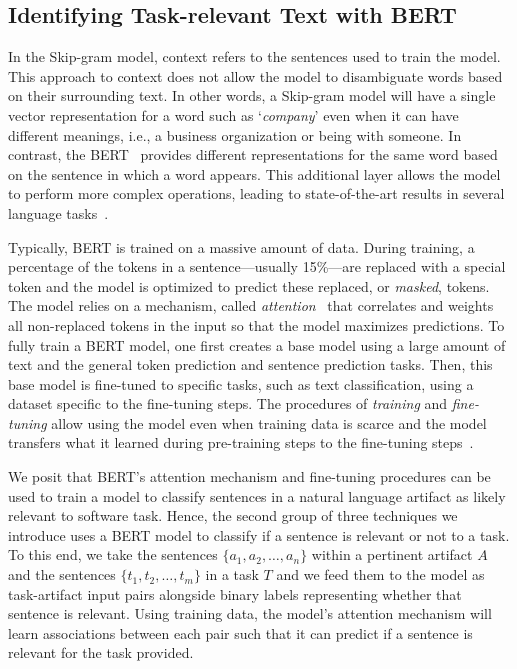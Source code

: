     

\subsection{Identifying Task-relevant Text with BERT}
\label{cp5:approach-bert}


In the Skip-gram model, context refers to the sentences used to train the model. This approach to context  does not allow the model to disambiguate words based on their surrounding text. In other words, a Skip-gram model will have a single vector representation for a word such as `\textit{company}' even when it can have different meanings, i.e., a business organization or being with someone. In contrast, 
the \acf{BERT}~\cite{Devlin2018Bert} provides different representations for the same word based on the sentence in which a word appears.
This additional layer allows the model to perform more complex operations,
leading to state-of-the-art results in several language tasks~\cite{Devlin2018Bert}. 





Typically, BERT is trained 
on a massive amount of data. During training, a percentage of the tokens in a sentence---usually 15\%---are replaced with a special token and the model is optimized to predict these replaced, or \textit{masked}, tokens. 
The model relies on a mechanism, called \textit{attention}~\cite{Vaswani2017attention} that correlates and weights all non-replaced tokens in the input so that the model maximizes predictions.
To fully train a BERT model, one first creates a base model using a large amount of text and the general token prediction and sentence prediction tasks. 
Then, this base model is fine-tuned to specific tasks, such as text classification, using a dataset specific to the fine-tuning steps. The procedures of \textit{training} and \textit{fine-tuning}
allow using the model even when training data is scarce and the model transfers
what it learned during pre-training steps to the fine-tuning steps~\cite{Devlin2018Bert}.


We posit that BERT's attention mechanism and fine-tuning procedures can be used to train a model to classify 
sentences in a natural language artifact as likely relevant to software task. Hence, the second group of three techniques we introduce uses a BERT model to classify if a sentence is relevant or not to a task.
To this end, we take the sentences $\{a_1, a_2, \dots, a_n\}$ within a pertinent artifact $A$ and the sentences $\{t_1, t_2, \dots, t_m\}$ in a task $T$ and we feed them to the model as task-artifact input pairs 
alongside binary labels representing whether that sentence is relevant. 
Using training data, the model's attention mechanism will learn associations between each pair such that it can predict if a sentence is relevant for the task provided. 


